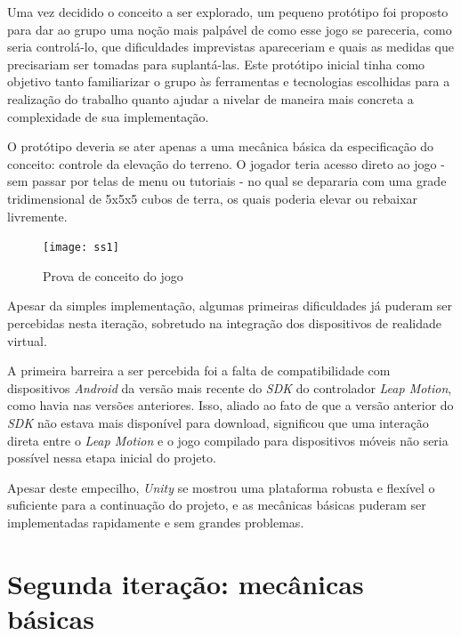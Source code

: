 Uma vez decidido o conceito a ser explorado, um pequeno protótipo foi proposto para dar ao grupo uma noção mais palpável de como esse jogo se pareceria, como seria controlá-lo, que dificuldades imprevistas apareceriam e quais as medidas que precisariam ser tomadas para suplantá-las. Este protótipo inicial tinha como objetivo tanto familiarizar o grupo às ferramentas e tecnologias escolhidas para a realização do trabalho quanto ajudar a nivelar de maneira mais concreta a complexidade de sua implementação.

O protótipo deveria se ater apenas a uma mecânica básica da especificação do conceito: controle da elevação do terreno. O jogador teria acesso direto ao jogo - sem passar por telas de menu ou tutoriais - no qual se depararia com uma grade tridimensional de 5x5x5 cubos de terra, os quais poderia elevar ou rebaixar livremente.

\begin{figure}[h]
	\centering
	\caption{Prova de conceito do jogo}
	\texttt{[image: ss1]}
	\legend{\fonteAP}
\end{figure}

Apesar da simples implementação, algumas  primeiras dificuldades já puderam ser percebidas nesta iteração, sobretudo na integração dos dispositivos de realidade virtual.

A primeira barreira a ser percebida foi a falta de compatibilidade com dispositivos \textit{Android} da versão mais recente do \textit{SDK} do controlador \textit{Leap Motion}, como havia nas versões anteriores. Isso, aliado ao fato de que a versão anterior do \textit{SDK} não estava mais disponível para download, significou que uma interação direta entre o \textit{Leap Motion} e o jogo compilado para dispositivos móveis não seria possível nessa etapa inicial do projeto.

Apesar deste empecilho, \textit{Unity} se mostrou uma plataforma robusta e flexível o suficiente para a continuação do projeto, e as mecânicas básicas puderam ser implementadas rapidamente e sem grandes problemas.



\section{Segunda iteração: mecânicas básicas}\label{sec-segunda-iteracao-mecanicas-basicas}

